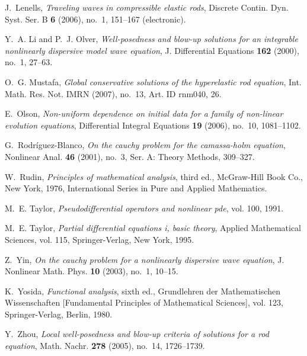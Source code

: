 \documentclass[final]{nddiss2e}
\begin{document}
\begin{thebibliography}{HKM09}
J.~Lenells, \emph{Traveling waves in compressible elastic rods}, Discrete
  Contin. Dyn. Syst. Ser. B \textbf{6} (2006), no.~1, 151--167 (electronic).

Y.~A. Li and P.~J. Olver, \emph{Well-posedness and blow-up solutions for an
  integrable nonlinearly dispersive model wave equation}, J. Differential
  Equations \textbf{162} (2000), no.~1, 27--63.

O.~G. Mustafa, \emph{Global conservative solutions of the hyperelastic rod
  equation}, Int. Math. Res. Not. IMRN (2007), no.~13, Art. ID rnm040, 26.

E.~Olson, \emph{Non-uniform dependence on initial data for a family of
  non-linear evolution equations}, Differential Integral Equations \textbf{19}
  (2006), no.~10, 1081--1102.

G.~Rodr\'iguez-Blanco, \emph{On the cauchy problem for the camassa-holm
  equation}, Nonlinear Anal. \textbf{46} (2001), no.~3, Ser. A: Theory Methods,
  309--327.

W.~Rudin, \emph{Principles of mathematical analysis}, third ed., McGraw-Hill
  Book Co., New York, 1976, International Series in Pure and Applied
  Mathematics. 

M.~E. Taylor, \emph{Pseudodifferential operators and nonlinear pde}, vol. 100,
  1991.

M.~E. Taylor, \emph{Partial differential equations i, basic theory}, Applied
  Mathematical Sciences, vol. 115, Springer-Verlag, New York, 1995.

Z.~Yin, \emph{On the cauchy problem for a nonlinearly dispersive wave
  equation}, J. Nonlinear Math. Phys. \textbf{10} (2003), no.~1, 10--15.

K.~Yosida, \emph{Functional analysis}, sixth ed., Grundlehren der
  Mathematischen Wissenschaften [Fundamental Principles of Mathematical
  Sciences], vol. 123, Springer-Verlag, Berlin, 1980. 

Y.~Zhou, \emph{Local well-posedness and blow-up criteria of solutions for a rod
  equation}, Math. Nachr. \textbf{278} (2005), no.~14, 1726--1739.

\end{thebibliography}
% 
%
\end{document}
